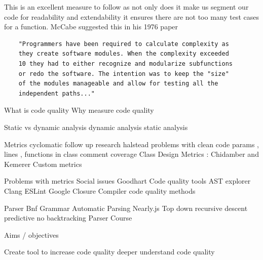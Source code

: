 This is an excellent measure to follow as not only does it make us segment our code for readability and extendability it ensures there are not too many test cases for a function.
\newline
McCabe suggested this in his 1976 paper \cite{cycloMaticComplexity}
\begin{verbatim}
    "Programmers have been required to calculate complexity as 
    they create software modules. When the complexity exceeded 
    10 they had to either recognize and modularize subfunctions 
    or redo the software. The intention was to keep the "size" 
    of the modules manageable and allow for testing all the 
    independent paths..."
\end{verbatim}

What is code quality
Why measure code quality



Static vs dynamic analysis
    dynamic analysis   
    static analysis

Metrics
    cyclomatic
        follow up research
    halstead 
        problems with
    clean code
        params , lines , functions in class
        comment coverage
    Class Design Metrics : Chidamber and Kemerer
    Custom metrics
    
    Problems with metrics
        Social issues
            Goodhart
Code quality tools
    AST explorer
    Clang
    ESLint
    Google Closure Compiler
code quality methods

Parser
    Bnf Grammar 
    Automatic Parsing
        Nearly.js
    Top down recursive descent predictive no backtracking Parser
    Course



Aims / objectives

    Create tool to increase code quality
    deeper understand code quality





